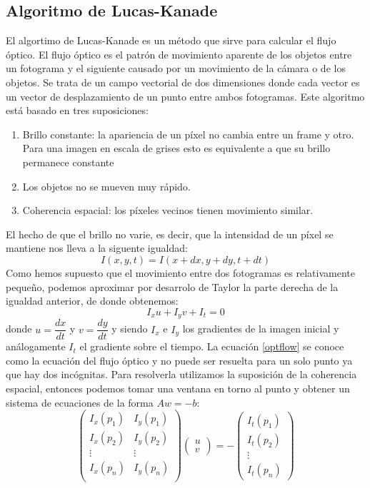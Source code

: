 \documentclass[a4paper,openright, 12pt]{book}
\begin{document}
\newpage
\subsection{Algoritmo de Lucas-Kanade}
El algortimo de Lucas-Kanade \cite{LucasKanade} es un método que sirve para calcular el flujo óptico.
El flujo óptico es el patrón de movimiento aparente de los objetos entre un fotograma y el siguiente causado por un movimiento de la cámara o de los objetos. Se trata de un campo vectorial de dos dimensiones donde cada vector es un vector de desplazamiento de un punto entre ambos fotogramas.
Este algoritmo está basado en tres suposiciones:
\begin{enumerate}
\item Brillo constante: la apariencia de un píxel no cambia entre un frame y otro. Para una imagen en escala de grises esto es equivalente a que su brillo permanece constante
\item Los objetos no se mueven muy rápido.
\item Coherencia espacial: los píxeles vecinos tienen movimiento similar.
\end{enumerate}
El hecho de que el brillo no varie, es decir, que la intensidad de un píxel se mantiene nos lleva a la siguente igualdad:
\begin{equation}
I(x,y,t)=I(x+dx,y+dy,t+dt)
\end{equation}
Como hemos supuesto que el movimiento entre dos fotogramas es relativamente pequeño, podemos aproximar por desarrolo de Taylor la parte derecha de la igualdad anterior, de donde obtenemos:
\begin{equation}
\label{optflow}
I_x u + I_y v + I_t = 0
\end{equation}
 donde $u= \dfrac{dx}{dt}$ y $v= \dfrac{dy}{dt}$ y siendo $I_x$ e $I_y$ los gradientes de la imagen inicial y análogamente $I_t$ el gradiente sobre el tiempo.
La ecuación \ref{optflow} se conoce como la ecuación del flujo óptico y no puede ser resuelta para un solo punto ya que hay dos incógnitas.
Para resolverla utilizamos la suposición de la coherencia espacial, entonces podemos tomar una ventana en torno al punto y obtener un sistema de ecuaciones de la forma $Aw=-b$:
\begin{equation}
\left(
\begin{matrix}
I_x(p_1) & I_y(p_1)\\
I_x(p_2) & I_y(p_2)\\
\vdots & \vdots \\
I_x(p_n) & I_y(p_n)\\
\end{matrix}
\right)
\left(\begin{array}{c}u\\v\end{array}\right)
=
- \left(\begin{array}{c} I_t(p_1)\\I_t(p_2)\\ \vdots\\ I_t(p_n)\end{array}\right)
\end{equation}
\end{document}
